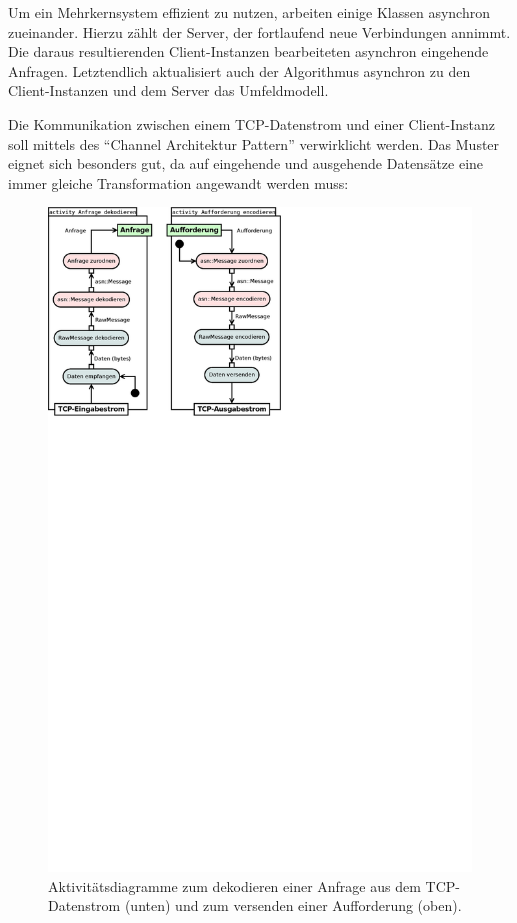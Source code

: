 Um ein Mehrkernsystem effizient zu nutzen, arbeiten einige Klassen asynchron zueinander.
Hierzu zählt der Server, der fortlaufend neue Verbindungen annimmt.
Die daraus resultierenden Client-Instanzen bearbeiteten asynchron eingehende Anfragen.
Letztendlich aktualisiert auch der Algorithmus asynchron zu den Client-Instanzen und dem Server das Umfeldmodell.

Die Kommunikation zwischen einem TCP-Datenstrom und einer Client-Instanz soll mittels des \enquote{Channel Architektur Pattern} \cite[157]{douglass2003real} verwirklicht werden.
Das Muster eignet sich besonders gut, da auf eingehende und ausgehende Datensätze eine immer gleiche Transformation angewandt werden muss:

\begin{figure}[h]
	\centering
	\includegraphics[width=1.4\textwidth]{dia/channel_sep}
	\caption{Aktivitätsdiagramme zum dekodieren einer Anfrage aus dem TCP-Datenstrom (unten) und zum versenden einer Aufforderung (oben).}
	\label{design:channel}
\end{figure}

